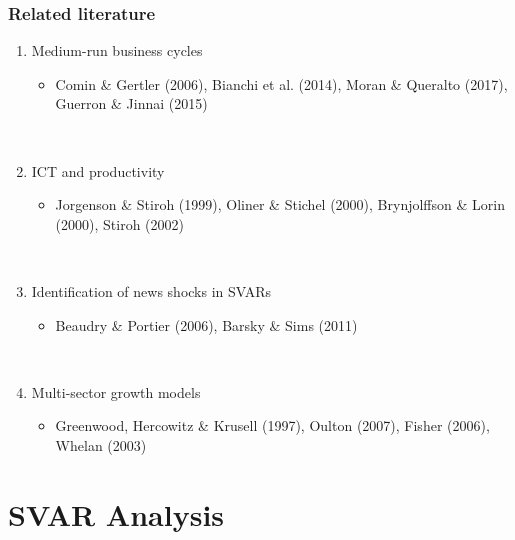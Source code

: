 \documentclass{beamer}
\begin{document}
\begin{frame}
	\frametitle{Related literature}
	
	\begin{enumerate}
	\item Medium-run business cycles 
		\begin{itemize}
		\item Comin \& Gertler (2006), Bianchi et al. (2014), Moran \& Queralto (2017), Guerron \& Jinnai (2015)
		\end{itemize}

	
	\
	
	\item ICT and productivity 
		\begin{itemize}
		\item Jorgenson \& Stiroh (1999), Oliner \& Stichel (2000),  Brynjolffson \& Lorin (2000), Stiroh (2002) %
		\end{itemize}
	
	\
	
	\item Identification of news shocks in SVARs
		\begin{itemize}
		\item Beaudry \& Portier (2006), Barsky \& Sims (2011)
		\end{itemize}
	
	\
	
	\item Multi-sector growth models
		\begin{itemize}
		\item Greenwood, Hercowitz \& Krusell (1997), Oulton (2007), Fisher (2006), Whelan (2003)
		\end{itemize}
	\end{enumerate}

	
\end{frame}

\section{SVAR Analysis}
\end{document}
